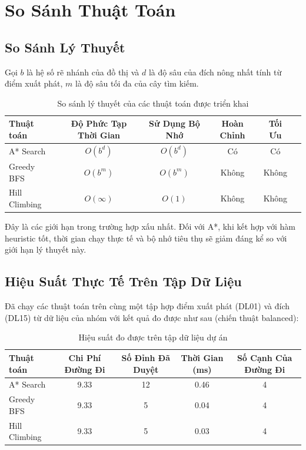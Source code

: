 \chapter{So Sánh Thuật Toán}
\label{chap:algorithm-comparison}

\section{So Sánh Lý Thuyết}

Gọi $b$ là hệ số rẽ nhánh của đồ thị và $d$ là độ sâu của đích nông nhất tính từ điểm xuất phát, $m$ là độ sâu tối đa của cây tìm kiếm.

\begin{table}[h!]
\centering
\caption{So sánh lý thuyết của các thuật toán được triển khai}
\begin{tabular}{lccccc}
\toprule
Thuật toán & Độ Phức Tạp Thời Gian & Sử Dụng Bộ Nhớ & Hoàn Chỉnh & Tối Ưu \\
\midrule
A* Search & $O(b^d)$ & $O(b^d)$ & Có & Có \\
Greedy BFS & $O(b^m)$ & $O(b^m)$ & Không & Không \\
Hill Climbing & $O(\infty)$ & $O(1)$ & Không & Không \\
\bottomrule
\end{tabular}
\end{table}

Đây là các giới hạn trong trường hợp xấu nhất. Đối với A*, khi kết hợp với hàm heuristic tốt, thời gian chạy thực tế và bộ nhớ tiêu thụ sẽ giảm đáng kể so với giới hạn lý thuyết này.

\section{Hiệu Suất Thực Tế Trên Tập Dữ Liệu}

Đã chạy các thuật toán trên cùng một tập hợp điểm xuất phát (DL01) và đích (DL15) từ dữ liệu của nhóm với kết quả đo được như sau (chiến thuật balanced):

\begin{table}[h!]
\centering
\caption{Hiệu suất đo được trên tập dữ liệu dự án}
\begin{tabular}{lcccc}
\toprule
Thuật toán & Chi Phí Đường Đi & Số Đỉnh Đã Duyệt & Thời Gian (ms) & Số Cạnh Của Đường Đi \\
\midrule
A* Search & 9.33 & 12 & 0.46 & 4 \\
Greedy BFS & 9.33 & 5 & 0.04 & 4 \\
Hill Climbing & 9.33 & 5 & 0.03 & 4 \\
\bottomrule
\end{tabular}
\end{table}

